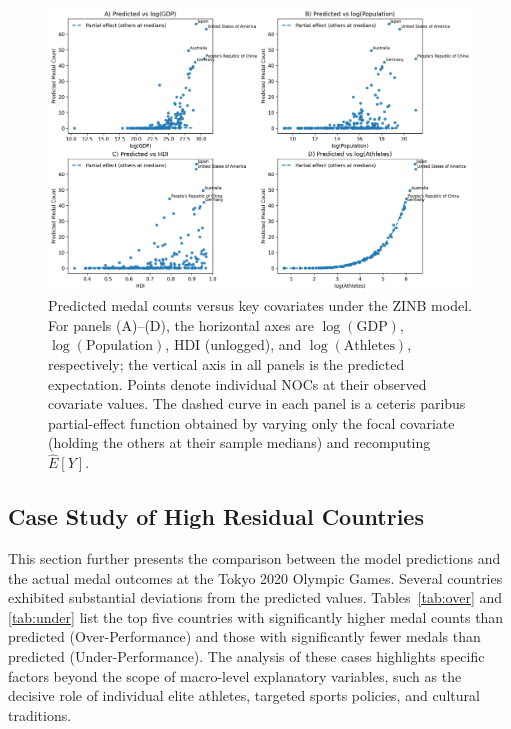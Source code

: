 \documentclass[11pt,twoside]{article}
\numberwithin{Theorem}{section}
\numberwithin{Definition}{section}
\numberwithin{Lemma}{section}
\numberwithin{Algorithm}{section}
\numberwithin{equation}{section}
\begin{document}
\begin{figure}[t]
  \centering
  \includegraphics[width=\linewidth]{four_panels_zinb.png}
  \caption{Predicted medal counts versus key covariates under the ZINB model.
For panels (A)--(D), the horizontal axes are $\log(\mathrm{GDP})$,
$\log(\mathrm{Population})$, HDI (unlogged), and $\log(\mathrm{Athletes})$,
respectively; the vertical axis in all panels is the predicted expectation. Points denote individual NOCs
at their observed covariate values. The dashed curve in each panel is a
ceteris paribus partial-effect function obtained by varying only the focal
covariate (holding the others at their sample medians) and recomputing
$\widehat{E}[Y]$.}

  \label{fig:four-panels-zinb}
\end{figure}

\subsection{Case Study of High Residual Countries}

This section further presents the comparison between the model predictions and the actual medal outcomes at the Tokyo 2020 Olympic Games. Several countries exhibited substantial deviations from the predicted values. Tables~\ref{tab:over} and \ref{tab:under} list the top five countries with significantly higher medal counts than predicted (Over-Performance) and those with significantly fewer medals than predicted (Under-Performance). The analysis of these cases highlights specific factors beyond the scope of macro-level explanatory variables, such as the decisive role of individual elite athletes, targeted sports policies, and cultural traditions.
\end{document}
